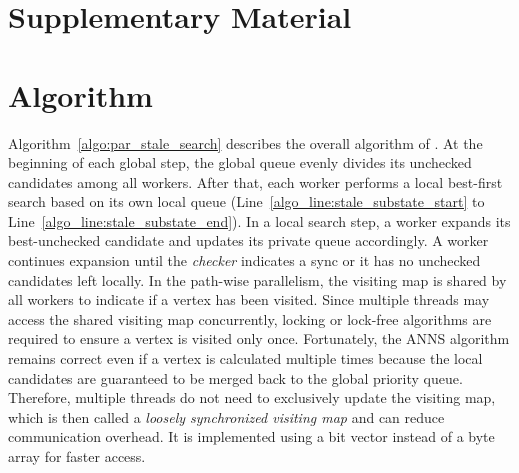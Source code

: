 
\clearpage
\nobalance
\section*{Supplementary Material}
\appendix

\section{\Hammer Algorithm} 




Algorithm~\ref{algo:par_stale_search} describes the overall algorithm of \Hammer. At the beginning of each global step, the global queue evenly divides its unchecked candidates among all workers.
After that, each worker performs a local best-first search based on its own local queue (Line~\ref{algo_line:stale_substate_start} to Line~\ref{algo_line:stale_substate_end}).
In a local search step, a worker expands its best-unchecked candidate and updates its private queue accordingly.
A worker continues expansion until the \emph{checker} indicates a sync
or it has no unchecked candidates left locally. 
In the path-wise parallelism, the visiting map is shared by all workers to indicate if a vertex has been visited.
Since multiple threads may access the shared visiting map concurrently, locking or lock-free algorithms are required to ensure a vertex is visited only once. 
Fortunately, the ANNS algorithm remains correct even if a vertex is calculated multiple times because the local candidates are guaranteed to be merged back to the global priority queue.
Therefore, multiple threads do not need to exclusively update the visiting map, which is then called a \emph{loosely synchronized visiting map} and can reduce communication overhead.
It is implemented using a bit vector instead of a byte array for faster access.


